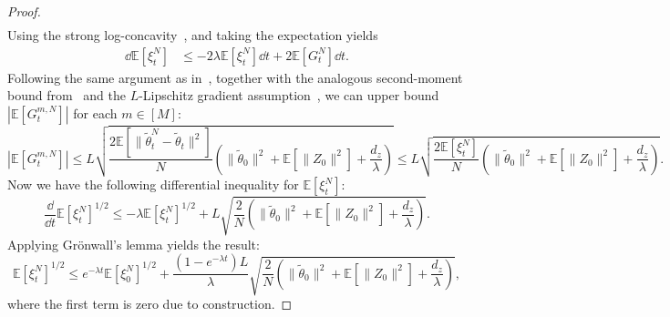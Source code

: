\begin{proof}
\begin{align*}
    \end{align*}
    Using the strong log-concavity~, 
    and taking the expectation yields
    \begin{align*}
        \dd \mathbb{E}[\xi_t^N] &\leq -2\lambda \mathbb{E}[\xi_t^N] \dd t + 2 \mathbb{E}[G_t^N] \dd t.
    \end{align*}
    Following the same argument as in~\citet[Lemma 13]{caprioerrorboundsparticle2024}, together with the analogous second-moment bound from~\citet[Proposition 26]{caprioerrorboundsparticle2024} and the $L$-Lipschitz gradient assumption~, we can upper bound $|\mathbb{E}[G_t^{m,N}]|$ for each $m\in [M]$:
    \begin{equation}
        \left|\mathbb{E}[G_t^{m,N}]\right|\leq L \sqrt{\frac{2\mathbb{E}\left[\|\tilde\theta_t^N - \tilde\theta_t\|^2\right]}{N} \left(\|\tilde\theta_0\|^2 + \mathbb{E}[\|Z_0\|^2] + \frac{d_z}{\lambda}\right)}\leq L \sqrt{\frac{2\mathbb{E}[\xi_t^N]}{N} \left(\|\tilde\theta_0\|^2 + \mathbb{E}[\|Z_0\|^2] + \frac{d_z}{\lambda}\right)}.
    \end{equation}
    Now we have the following differential inequality for $\mathbb{E}[\xi_t^N]$:
    \begin{equation}
        \frac{\dd}{\dd t} \mathbb{E}[\xi_t^N]^{1/2} \leq -\lambda \mathbb{E}[\xi_t^N]^{1/2} + L \sqrt{\frac{2}{N} \left(\|\tilde\theta_0\|^2 + \mathbb{E}[\|Z_0\|^2] + \frac{d_z}{\lambda}\right)}.
    \end{equation}
    Applying Gr\"onwall's lemma yields the result:
    \begin{equation}
        \mathbb{E}[\xi_t^N]^{1/2} \leq e^{-\lambda t} \mathbb{E}[\xi_0^N]^{1/2} + \frac{(1-e^{-\lambda t})L}{\lambda} \sqrt{\frac{2}{N} \left(\|\tilde\theta_0\|^2 + \mathbb{E}[\|Z_0\|^2] + \frac{d_z}{\lambda}\right)},
    \end{equation}
    where the first term is zero due to construction.
\end{proof}

